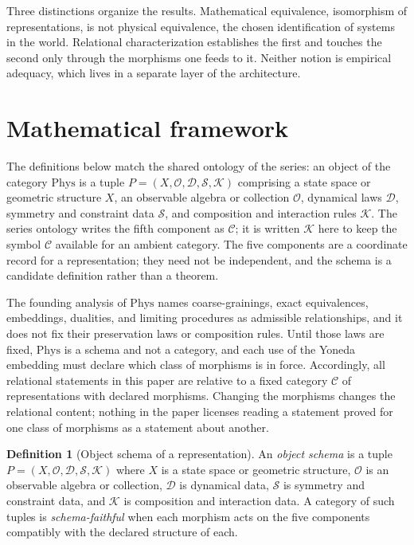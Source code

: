 \documentclass[11pt,letterpaper]{article}
\theoremstyle{definition}
\newtheorem{definition}[theorem]{Definition}
\theoremstyle{remark}
\begin{document}
Three distinctions organize the results. Mathematical equivalence, isomorphism of representations, is not physical equivalence, the chosen identification of systems in the world. Relational characterization establishes the first and touches the second only through the morphisms one feeds to it. Neither notion is empirical adequacy, which lives in a separate layer of the architecture.

\section{Mathematical framework}
\label{sec:framework}

The definitions below match the shared ontology of the series: an object of the category $\mathrm{Phys}$ is a tuple $P = (X, \mathcal{O}, \mathcal{D}, \mathcal{S}, \mathcal{K})$ comprising a state space or geometric structure $X$, an observable algebra or collection $\mathcal{O}$, dynamical laws $\mathcal{D}$, symmetry and constraint data $\mathcal{S}$, and composition and interaction rules $\mathcal{K}$. The series ontology writes the fifth component as $\mathcal{C}$; it is written $\mathcal{K}$ here to keep the symbol $\mathcal{C}$ available for an ambient category. The five components are a coordinate record for a representation; they need not be independent, and the schema is a candidate definition rather than a theorem.

The founding analysis of $\mathrm{Phys}$ names coarse-grainings, exact equivalences, embeddings, dualities, and limiting procedures as admissible relationships, and it does not fix their preservation laws or composition rules. Until those laws are fixed, $\mathrm{Phys}$ is a schema and not a category, and each use of the Yoneda embedding must declare which class of morphisms is in force. Accordingly, all relational statements in this paper are relative to a fixed category $\mathcal{C}$ of representations with declared morphisms. Changing the morphisms changes the relational content; nothing in the paper licenses reading a statement proved for one class of morphisms as a statement about another.

\begin{definition}[Object schema of a representation]
\label{def:schema}
An \emph{object schema} is a tuple $P = (X, \mathcal{O}, \mathcal{D}, \mathcal{S}, \mathcal{K})$ where $X$ is a state space or geometric structure, $\mathcal{O}$ is an observable algebra or collection, $\mathcal{D}$ is dynamical data, $\mathcal{S}$ is symmetry and constraint data, and $\mathcal{K}$ is composition and interaction data. A category of such tuples is \emph{schema-faithful} when each morphism acts on the five components compatibly with the declared structure of each.
\end{definition}
\end{document}
